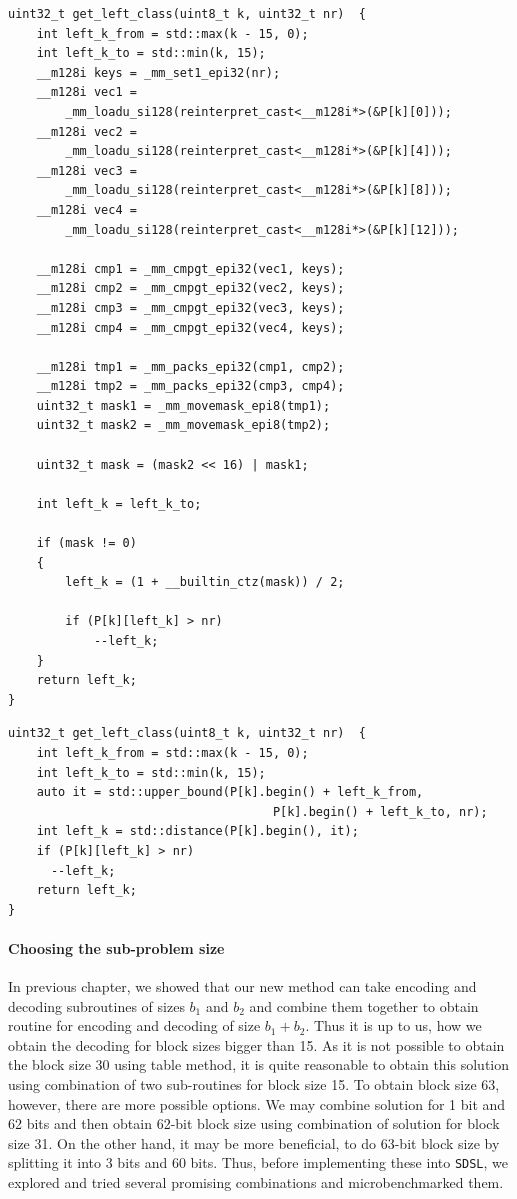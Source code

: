 \begin{lstlisting}
uint32_t get_left_class(uint8_t k, uint32_t nr)  {
	int left_k_from = std::max(k - 15, 0);
	int left_k_to = std::min(k, 15);
	__m128i keys = _mm_set1_epi32(nr);
	__m128i vec1 =
		_mm_loadu_si128(reinterpret_cast<__m128i*>(&P[k][0]));
	__m128i vec2 =
		_mm_loadu_si128(reinterpret_cast<__m128i*>(&P[k][4]));
	__m128i vec3 =
		_mm_loadu_si128(reinterpret_cast<__m128i*>(&P[k][8]));
	__m128i vec4 =
		_mm_loadu_si128(reinterpret_cast<__m128i*>(&P[k][12]));

	__m128i cmp1 = _mm_cmpgt_epi32(vec1, keys);
	__m128i cmp2 = _mm_cmpgt_epi32(vec2, keys);
	__m128i cmp3 = _mm_cmpgt_epi32(vec3, keys);
	__m128i cmp4 = _mm_cmpgt_epi32(vec4, keys);

	__m128i tmp1 = _mm_packs_epi32(cmp1, cmp2);
	__m128i tmp2 = _mm_packs_epi32(cmp3, cmp4);
	uint32_t mask1 = _mm_movemask_epi8(tmp1);
	uint32_t mask2 = _mm_movemask_epi8(tmp2);

	uint32_t mask = (mask2 << 16) | mask1;

	int left_k = left_k_to;

	if (mask != 0)
	{
		left_k = (1 + __builtin_ctz(mask)) / 2;

		if (P[k][left_k] > nr)
			--left_k;
	}
	return left_k;
}
\end{lstlisting}

\begin{lstlisting}
uint32_t get_left_class(uint8_t k, uint32_t nr)  {
	int left_k_from = std::max(k - 15, 0);
	int left_k_to = std::min(k, 15);
	auto it = std::upper_bound(P[k].begin() + left_k_from,
                                     P[k].begin() + left_k_to, nr);
    int left_k = std::distance(P[k].begin(), it);
    if (P[k][left_k] > nr)
      --left_k;
	return left_k;
}
\end{lstlisting}

\paragraph{Choosing the sub-problem size}

In previous chapter, we showed that our new method can take encoding and decoding subroutines
of sizes $b_1$ and $b_2$ and combine them together to obtain routine for encoding and
decoding of size $b_1+b_2$. Thus it is up to us, how we obtain the decoding for block sizes
bigger than 15. As it is not possible to obtain the block size 30 using table method,
it is quite reasonable to obtain this solution using combination of two sub-routines for block
size 15. To obtain block size 63, however, there are more possible options. We may combine
solution for 1 bit and 62 bits and then obtain 62-bit block size using combination of
solution for block size 31. On the other hand, it may be more beneficial, to do 63-bit
block size by splitting it into 3 bits and 60 bits. Thus, before implementing these into
\texttt{SDSL}, we explored and tried several promising combinations and microbenchmarked them.

